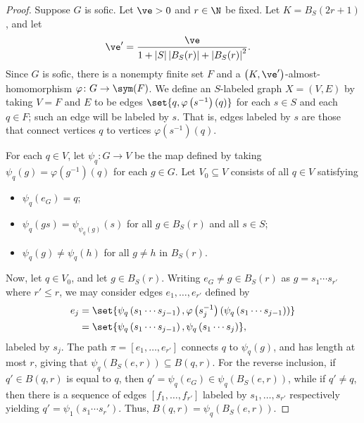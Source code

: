 \documentclass[10pt]{mypackage}
\begin{document}
\begin{proof}
  Suppose $G$ is sofic. Let $\ve > 0$ and $r\in \N$ be fixed. Let $K = B_S\left( 2r + 1 \right)$, and let
  \begin{align*}
    \ve' &= \frac{\ve}{1 + \left\vert S \right\vert\left\vert B_S(r) \right\vert + \left\vert B_S(r) \right\vert^2}.
  \end{align*}
  Since $G$ is sofic, there is a nonempty finite set $F$ and a $\left( K,\ve' \right)$-almost-homomorphism $\varphi\colon G\rightarrow \sym(F)$. We define an $S$-labeled graph $X = \left( V,E \right)$ by taking $V = F$ and $E$ to be edges $\set{q,\varphi\left( s^{-1} \right)(q)}$ for each $s\in S$ and each $q\in F$; such an edge will be labeled by $s$. That is, edges labeled by $s$ are those that connect vertices $q$ to vertices $\varphi\left( s^{-1} \right)(q)$.

  For each $q\in V$, let $\psi_{q}\colon G\to V$ be the map defined by taking $\psi_{q}\left( g \right) = \varphi\left( g^{-1} \right)(q)$ for each $g\in G$. Let $V_0\subseteq V$ consists of all $q\in V$ satisfying
  \begin{itemize}
    \item $\psi_q\left( e_G \right) = q$;
    \item $\psi_q\left( gs \right) = \psi_{\psi_q(g)}(s)$ for all $g\in B_S(r)$ and all $s\in S$;
    \item $\psi_{q}(g) \neq \psi_q(h)$ for all $g\neq h$ in $B_S\left( r \right)$.
  \end{itemize}
  Now, let $q\in V_0$, and let $g\in B_S(r)$. Writing $e_G\neq g\in B_S(r)$ as $g = s_1\cdots s_{r'}$ where $r' \leq r$, we may consider edges $e_1,\dots,e_{r'}$ defined by
  \begin{align*}
    e_j &= \set{\psi_{q}\left( s_1\cdots s_{j-1} \right),\varphi\left( s_j^{-1} \right)\left( \psi_{q}\left( s_1\cdots s_{j-1} \right) \right)}\\
        &= \set{\psi_q\left( s_1\cdots s_{j-1} \right),\psi_q\left( s_1\cdots s_j \right)},
  \end{align*}
  labeled by $s_j$. The path $\pi = \left[ e_1,\dots,e_{r'} \right]$ connects $q$ to $\psi_q(g)$, and has length at most $r$, giving that $\psi_q\left( B_S(e,r) \right)\subseteq B\left( q,r \right)$. For the reverse inclusion, if $q' \in B\left( q,r \right)$ is equal to $q$, then $q' = \psi_q\left( e_G \right)\in \psi_q\left( B_S(e,r) \right)$, while if $q'\neq q$, then there is a sequence of edges $\left[ f_1,\dots,f_{r'} \right]$ labeled by $s_1,\dots,s_{r'}$ respectively yielding $q' = \psi_1\left( s_1\cdots s_r' \right)$. Thus, $B\left( q,r \right) = \psi_q\left( B_S(e,r) \right)$.


\end{proof}
\end{document}
